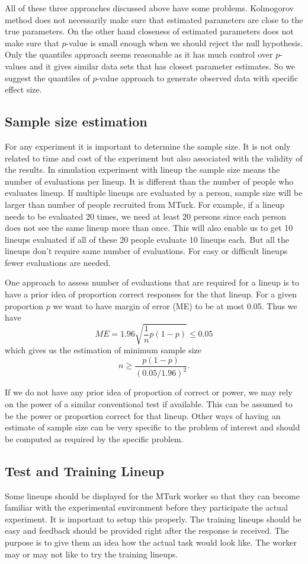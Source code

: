 \documentclass[11pt]{article}
\begin{document}
All of these three approaches discussed above have some problems. Kolmogorov method does not necessarily make sure that estimated parameters are close to the true parameters. On the other hand closeness of estimated parameters does not make sure that $p$-value is small enough when we should reject the null hypothesis. Only the quantiles approach seems reasonable as it has much control over $p$-values and it gives similar data sets that has closest parameter estimates. So we suggest the quantiles of $p$-value approach to generate observed data with specific effect size.

\subsection{Sample size estimation} For any experiment it is important to determine the sample size. It is not only related to time and cost of the experiment but also associated with the validity of the results. In simulation experiment with lineup the sample size means the number of evaluations per lineup. It is different than the number of people who evaluates lineup. If multiple lineups are evaluated by a person, sample size will be larger than number of people recruited from MTurk. For example, if a lineup needs to be evaluated 20 times, we need at least 20 persons since each person does not see the same lineup more than once. This will also enable us to get 10 lineups evaluated if all of these 20 people evaluate 10 lineups each. But all the lineups don't require same number of evaluations. For easy or difficult lineups fewer evaluations are needed.

One approach to assess number of evaluations that are required for a lineup is to have a prior idea of proportion correct responses for the that lineup. For a given proportion $p$ we want to have margin of error (ME) to be at most 0.05. Thus we have $$ME =1.96 \sqrt{ \frac 1 n p(1-p)} \le 0.05$$ which gives us the estimation of minimum sample size $$n \geq \frac{p(1-p)}{(0.05/1.96)^2}.$$ 

If we do not have any prior idea of proportion of correct or power, we may rely on the power of a similar conventional test if available. This can be assumed to be the power or proportion correct for that lineup. Other ways of having an estimate of sample size can be very specific to the problem of interest and should be computed as required by the specific problem.

\subsection{Test and Training Lineup} Some lineups should be displayed for the MTurk worker so that they can become familiar with the experimental environment before they participate the actual experiment. It is important to setup this properly. The training lineups should be easy and feedback should be provided right after the response is received. The purpose is to give them an idea how the actual task would look like. The worker may or may not like to try the training lineups.
\end{document}
